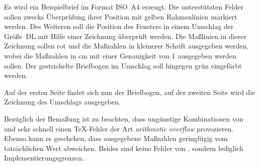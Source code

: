 \begin{Example}
  Es wird ein Beispielbrief im Format ISO~A4 erzeugt. Die unterstützten Felder
  sollen zwecks Überprüfung ihrer Position mit gelben Rahmenlinien markiert
  werden. Des Weiteren soll die Position des Fensters in einem Umschlag der
  Größe~DL mit Hilfe einer Zeichnung überprüft werden. Die Maßlinien in dieser
  Zeichnung sollen rot und die Maßzahlen in kleinerer Schrift ausgegeben
  werden, wobei die Maßzahlen in cm mit einer Genauigkeit von 1
  ausgegeben werden sollen. Der gestrichelte Briefbogen im Umschlag soll
  hingegen grün eingefärbt werden.
  Auf der ersten Seite findet sich nun der Briefbogen, auf der zweiten Seite
  wird die Zeichnung des Umschlags ausgegeben.
\end{Example}

Bezüglich der Bemaßung ist zu beachten, dass ungünstige Kombinationen von
 und  sehr schnell einen \TeX-Fehler der
Art \emph{arithmetic overflow} provozieren. Ebenso kann es geschehen, dass
ausgegebene Maßzahlen geringfügig vom tatsächlichen Wert abweichen. Beides
sind keine Fehler von , sondern lediglich
Implementierungsgrenzen.
%
\EndIndexGroup
%
\EndIndexGroup
%
\EndIndexGroup


